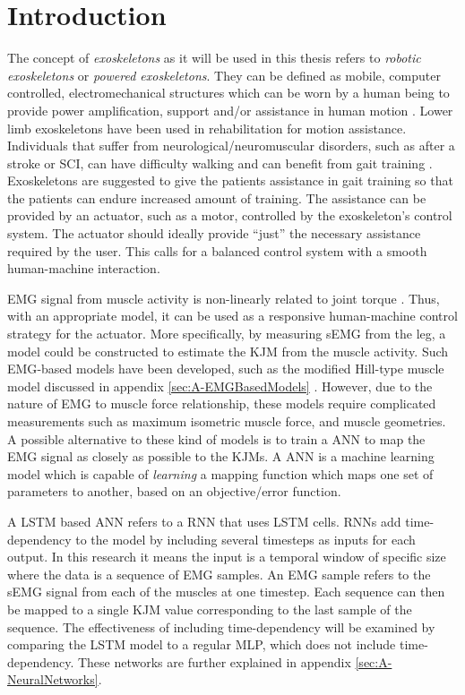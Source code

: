 \documentclass[../main.tex]{subfiles}
\begin{document}
\chapter{Introduction}
The concept of \textit{exoskeletons} as it will be used in this thesis refers to \textit{robotic exoskeletons} or \textit{powered exoskeletons}. 
They can be defined as mobile, computer controlled, electromechanical structures which can be worn by a human being to provide power amplification, support and/or assistance in human motion \cite{Anam2012, Gorgey2018}. 
Lower limb exoskeletons have been used in rehabilitation for motion assistance.
Individuals that suffer from neurological/neuromuscular disorders, such as after a stroke or \ac{SCI}, can have difficulty walking and can benefit from gait training \cite{Gorgey2018, Young2017, Lerner2017}.
Exoskeletons are suggested to give the patients assistance in gait training so that the patients can endure increased amount of training.
The assistance can be provided by an actuator, such as a motor, controlled by the exoskeleton's control system.
The actuator should ideally provide ``just'' the necessary assistance required by the user.
This calls for a balanced control system with a smooth human-machine interaction.

\Ac{EMG} signal from muscle activity is non-linearly related to joint torque \cite{Young2017}.
Thus, with an appropriate model, it can be used as a responsive human-machine control strategy for the actuator.
More specifically, by measuring \ac{sEMG} from the leg, a model could be constructed to estimate the \ac{KJM} from the muscle activity.
Such \ac{EMG}-based models have been developed, such as the modified Hill-type muscle model discussed in appendix \ref{sec:A-EMGBasedModels} \cite{Pizzolato2015, Erdemir2007, Lloyd2003}.
However, due to the nature of \ac{EMG} to muscle force relationship, these models require complicated measurements such as maximum isometric muscle force, and muscle geometries.
A possible alternative to these kind of models is to train a \ac{ANN} to map the \ac{EMG} signal as closely as possible to the \acp{KJM}.
A \ac{ANN} is a machine learning model which is capable of \textit{learning} a mapping function which maps one set of parameters to another, based on an objective/error function. 

A \ac{LSTM} based \ac{ANN} refers to a \ac{RNN} that uses \ac{LSTM} cells.
\acp{RNN} add time-dependency to the model by including several timesteps as inputs for each output.
In this research it means the input is a temporal window of specific size where the data is a sequence of \ac{EMG} samples.
An \ac{EMG} sample refers to the \ac{sEMG} signal from each of the muscles at one timestep.
Each sequence can then be mapped to a single \ac{KJM} value corresponding to the last sample of the sequence.
The effectiveness of including time-dependency will be examined by comparing the \ac{LSTM} model to a regular \ac{MLP}, which does not include time-dependency.
These networks are further explained in appendix \ref{sec:A-NeuralNetworks}.
\end{document}
